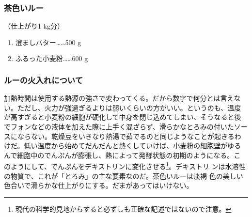 \maeaki
\begin{recette}
\hypertarget{roux-brun}{%
\subsubsection{茶色いルー}\label{roux-brun}}


 

（仕上がり1 kg分）

\begin{enumerate}
\def\labelenumi{\arabic{enumi}.}
\tightlist
\item
  澄ましバター\ldots{}\ldots{}500 g
\item
  ふるった小麦粉\ldots{}\ldots{}600 g
\end{enumerate}

\maeaki

\hypertarget{cuisson-des-roux}{%
\subsubsection{ルーの火入れについて}\label{cuisson-des-roux}}


加熱時間は使用する熱源の強さで変わってくる。だから数字で何分とは言えな
い。ただし、火力が強過ぎるよりは弱いくらいの方がいい。というのも、温度
が高すぎると小麦粉の細胞が硬化して中身を閉じ込めてしまい、そうなると後
でフォンなどの液体を加えた際に上手く混ざらず、滑らかなとろみの付いたソー
スにならない。乾燥豆をいきなり熱湯で茹でるのと同じようなことが起きるわ
けだ。低い温度から始めてだんだんと熱くしていけば、小麦粉の細胞壁がゆる
んで細胞中のでんぷんが膨張し、熱によって発酵状態の初期のようになる。こ
のようにして、でんぷんをデキストリンに変化させる\footnote{現代の科学的見地からすると必ずしも正確な記述ではないので注意。}。デキストリ
ンは水溶性の物質で、これが「とろみ」の主な要素なのだ。茶色いルーは淡褐
色の美しい色合いで滑らかな仕上がりにする。だまがあってはいけない。


\end{recette}

